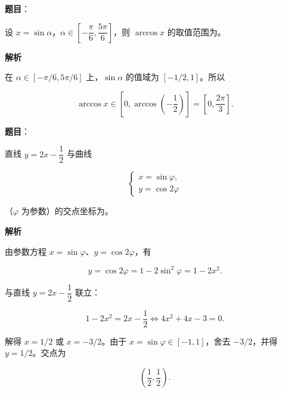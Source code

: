 \begin{answer}

\textbf{题目}：

设 $x=\sin\alpha$，$\alpha\in\left[-\dfrac\pi6,\dfrac{5\pi}6\right]$，则 $\arccos x$ 的取值范围为\gkblank{}。

\textbf{解析}

在 $\alpha\in[-\pi/6,5\pi/6]$ 上，$\sin\alpha$ 的值域为 $[-1/2,1]$。所以

\nopagebreak[4]
\[
\arccos x\in\left[0,\arccos\left(-\frac12\right)\right]
=\left[0,\frac{2\pi}{3}\right].
\]


\end{answer}
\begin{answer}

\textbf{题目}：

直线 $y=2x-\dfrac12$ 与曲线

\nopagebreak[4]
\[
\begin{cases}
x=\sin\varphi,\\
y=\cos2\varphi
\end{cases}
\]

（$\varphi$ 为参数）的交点坐标为\gkblank{}。

\textbf{解析}

由参数方程 $x=\sin\varphi$、$y=\cos2\varphi$，有

\nopagebreak[4]
\[
y=\cos2\varphi=1-2\sin^2\varphi=1-2x^2.
\]

与直线 $y=2x-\dfrac12$ 联立：

\nopagebreak[4]
\[
1-2x^2=2x-\frac12
\Longleftrightarrow 4x^2+4x-3=0.
\]

解得 $x=1/2$ 或 $x=-3/2$。由于 $x=\sin\varphi\in[-1,1]$，舍去 $-3/2$，并得 $y=1/2$。交点为

\nopagebreak[4]
\[
\left(\frac12,\frac12\right).
\]


\end{answer}
